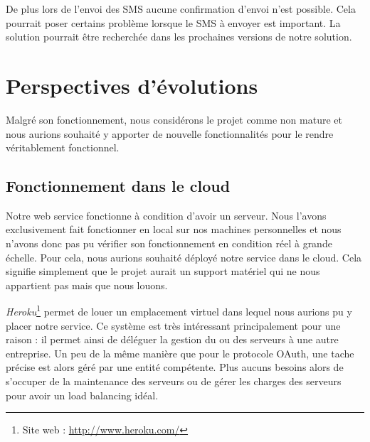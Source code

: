 De plus lors de l'envoi des SMS aucune confirmation d'envoi n'est possible.
Cela pourrait poser certains problème lorsque le SMS à envoyer est important.
La solution pourrait être recherchée dans les prochaines versions de notre solution.






\section{Perspectives d'évolutions}

Malgré son fonctionnement, nous considérons le projet comme non mature et nous aurions souhaité y apporter de
nouvelle fonctionnalités pour le rendre véritablement fonctionnel.




\subsection{Fonctionnement dans le cloud}

Notre web service fonctionne à condition d'avoir un serveur. Nous l'avons exclusivement fait fonctionner en local
sur nos machines personnelles et nous n'avons donc pas pu vérifier son fonctionnement en condition réel à grande
échelle. Pour cela, nous aurions souhaité déployé notre service dans le cloud. Cela signifie simplement que le 
projet aurait un support matériel qui ne nous appartient pas mais que nous louons. 

\textit{Heroku}\footnote{Site web : \href{http://www.heroku.com/}{http://www.heroku.com/}} permet de louer un emplacement virtuel 
dans lequel nous aurions pu y placer notre service. Ce système est très intéressant principalement pour une raison : il permet ainsi de déléguer la gestion du ou des serveurs à une autre entreprise. Un peu de la même manière que pour
le protocole OAuth, une tache précise est alors géré par une entité compétente. Plus aucuns besoins alors de s'occuper
de la maintenance des serveurs ou de gérer les charges des serveurs pour avoir un load balancing idéal.

